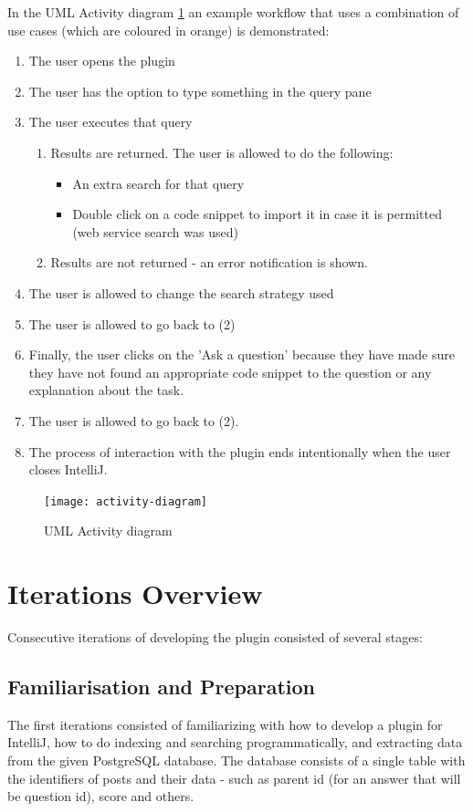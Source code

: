 \documentclass{l4proj}
\begin{document}
\noindent
In the UML Activity diagram \ref{fig:activity-diagram} an example workflow that uses a combination of use cases (which are coloured in orange) is demonstrated:
\begin{enumerate}
\item The user opens the plugin
\item The user has the option to type something in the query pane
\item The user executes that query

\begin{enumerate}
\item Results are returned. The user is allowed to do the following:
\begin{itemize}
\item An extra search for that query
\item Double click on a code snippet to import it in case it is permitted (web service search was used)
\end{itemize}
\item Results are not returned - an error notification is shown.  
\end{enumerate}

\item The user is allowed to change the search strategy used
\item The user is allowed to go back to (2)
\item Finally, the user clicks on the 'Ask a question' because they have made sure they have not found an appropriate code snippet to the question or any explanation about the task. 
\item The user is allowed to go back to (2).
\item The process of interaction with the plugin ends intentionally when the user closes IntelliJ.
\end{enumerate}

\begin{figure}[H]
\texttt{[image: activity-diagram]}
\centering
\caption{UML Activity diagram}\label{activity-diagram}
\label{fig:activity-diagram}
\end{figure}

\section{Iterations Overview}
Consecutive iterations of developing the plugin consisted of several stages:

\subsection{Familiarisation and Preparation}
The first iterations consisted of familiarizing with how to develop a plugin for IntelliJ, how to do indexing and searching programmatically, and extracting data from the given PostgreSQL database. The database consists of a single table with the identifiers of posts and their data - such as parent id (for an answer that will be question id), score and others.
\end{document}
